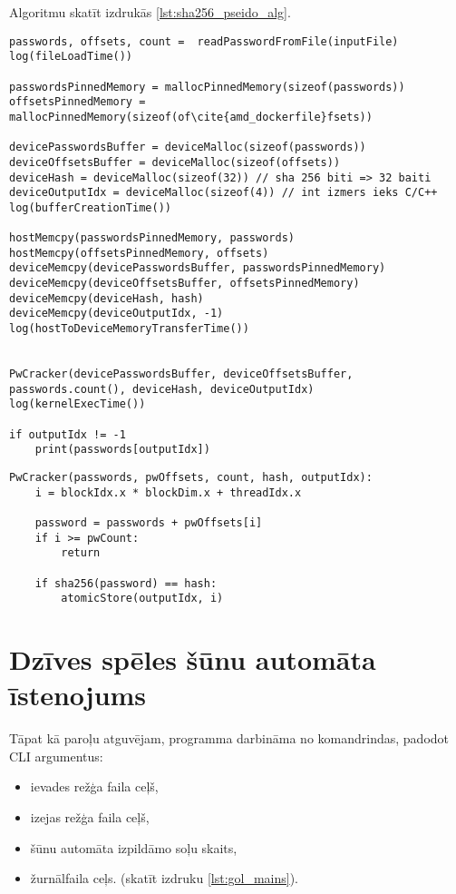 Algoritmu skatīt izdrukās \ref{lst:sha256_pseido_alg}.
\begin{lstlisting}[caption={Paroļu atguvēja CPU puses pseidokods}, label=lst:sha256_pseido_alg]
passwords, offsets, count =  readPasswordFromFile(inputFile)
log(fileLoadTime())

passwordsPinnedMemory = mallocPinnedMemory(sizeof(passwords))
offsetsPinnedMemory = mallocPinnedMemory(sizeof(of\cite{amd_dockerfile}fsets))

devicePasswordsBuffer = deviceMalloc(sizeof(passwords))
deviceOffsetsBuffer = deviceMalloc(sizeof(offsets))
deviceHash = deviceMalloc(sizeof(32)) // sha 256 biti => 32 baiti
deviceOutputIdx = deviceMalloc(sizeof(4)) // int izmers ieks C/C++
log(bufferCreationTime())

hostMemcpy(passwordsPinnedMemory, passwords)
hostMemcpy(offsetsPinnedMemory, offsets)
deviceMemcpy(devicePasswordsBuffer, passwordsPinnedMemory)
deviceMemcpy(deviceOffsetsBuffer, offsetsPinnedMemory)
deviceMemcpy(deviceHash, hash)
deviceMemcpy(deviceOutputIdx, -1)
log(hostToDeviceMemoryTransferTime())


PwCracker(devicePasswordsBuffer, deviceOffsetsBuffer, passwords.count(), deviceHash, deviceOutputIdx)
log(kernelExecTime())

if outputIdx != -1
    print(passwords[outputIdx])
\end{lstlisting}


\begin{lstlisting}[caption={Paroļu atguvēja GPGPU kodola pseidokods}, label=lst:sha256_pseido_alg_device]
PwCracker(passwords, pwOffsets, count, hash, outputIdx):
    i = blockIdx.x * blockDim.x + threadIdx.x

    password = passwords + pwOffsets[i]
    if i >= pwCount:
        return

    if sha256(password) == hash:
        atomicStore(outputIdx, i)
\end{lstlisting}

\section{Dzīves spēles šūnu automāta īstenojums} \label{gol_section}

Tāpat kā paroļu atguvējam, programma darbināma no komandrindas, padodot CLI
argumentus:
\begin{itemize}
    \item ievades režģa faila ceļš,
    \item izejas režģa faila ceļš,
    \item šūnu automāta izpildāmo soļu skaits,
    \item žurnālfaila ceļs. (skatīt izdruku \ref{lst:gol_mains}).
\end{itemize}

